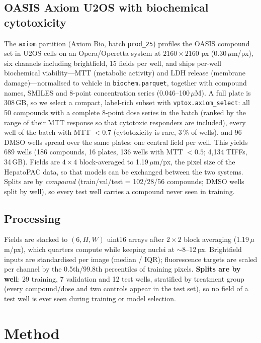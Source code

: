 \documentclass[11pt,a4paper]{article}
\begin{document}
\subsection{OASIS Axiom U2OS with biochemical cytotoxicity}
The \texttt{axiom} partition (Axiom Bio, batch \texttt{prod\_25}) profiles the OASIS compound set in U2OS cells on an Opera/Operetta system at $2160\times2160$ px (0.30\,$\mu$m/px), six channels including brightfield, 15 fields per well, and ships per-well biochemical viability---MTT (metabolic activity) and LDH release (membrane damage)---normalised to vehicle in \texttt{biochem.parquet}, together with compound names, SMILES and 8-point concentration series (0.046--100\,$\mu$M). A full plate is 308\,GB, so we select a compact, label-rich subset with \texttt{vptox.axiom\_select}: all 50 compounds with a complete 8-point dose series in the batch (ranked by the range of their MTT response so that cytotoxic responders are included), every well of the batch with MTT $<0.7$ (cytotoxicity is rare, 3\,\% of wells), and 96 DMSO wells spread over the same plates; one central field per well. This yields 689 wells (186 compounds, 16 plates, 136 wells with MTT $<0.5$; 4,134 TIFFs, 34\,GB). Fields are $4\times4$ block-averaged to 1.19\,$\mu$m/px, the pixel size of the HepatoPAC data, so that models can be exchanged between the two systems. Splits are by \emph{compound} (train/val/test = 102/28/56 compounds; DMSO wells split by well), so every test well carries a compound never seen in training.

\subsection{Processing}
Fields are stacked to $(6,H,W)$ uint16 arrays after $2\times2$ block averaging (1.19\,$\mu$m/px), which quarters compute while keeping nuclei at $\sim$8--12\,px. Brightfield inputs are standardised per image (median / IQR); fluorescence targets are scaled per channel by the 0.5th/99.8th percentiles of training pixels. \textbf{Splits are by well}: 29 training, 7 validation and 12 test wells, stratified by treatment group (every compound/dose and two controls appear in the test set), so no field of a test well is ever seen during training or model selection.

\section{Method}
\label{sec:method}
\end{document}
